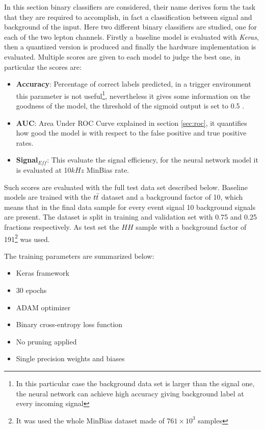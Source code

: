 \documentclass[../../main.tex]{subfiles}
\begin{document}
In this section binary classifiers are considered, their name derives form the task that they are required to accomplish, in fact a classification between signal and background of the input. Here two different binary classifiers are studied, one for each of the two lepton channels. Firstly a baseline model is evaluated with \textit{Keras}, then a quantized version is produced and finally the hardware implementation is evaluated.  
Multiple scores are given to each model to judge the best one, in particular the scores are:
\begin{itemize}
    \item \textbf{Accuracy}: Percentage of correct labels predicted, in a trigger environment this parameter is not useful\footnote{In this particular case the background data set is larger than the signal one, the neural network can achieve high accuracy giving background label at every incoming signal}, nevertheless it gives some information on the goodness of the model, the threshold of the sigmoid output is set to 0.5 .
    \item \textbf{AUC}: Area Under ROC Curve explained in section \ref{sec:roc}, it quantifies how good the model is with respect to the false positive and true positive rates.
    \item \textbf{Signal$_{Eff}$}: This evaluate the signal efficiency, for the neural network model it is evaluated at 10$kHz$ MinBias rate.
\end{itemize} 
Such scores are evaluated with the full test data set described below.
Baseline models are trained with the $t \Bar{t}$ dataset and a background factor of 10, which means that in the final data sample for every event signal 10 background signals are present. The dataset is split in training and validation set with 0.75 and 0.25 fractions respectively. As test set the $HH$ sample with a background factor of 191\footnote{It was used the whole MinBias dataset made of $761\times10^3$ samples} was used.  

The training parameters are summarized below:
\begin{itemize}
    \item Keras framework
    \item 30 epochs
    \item ADAM optimizer
    \item Binary cross-entropy loss function
    \item No pruning applied
    \item Single precision weights and biases
\end{itemize}
\end{document}
